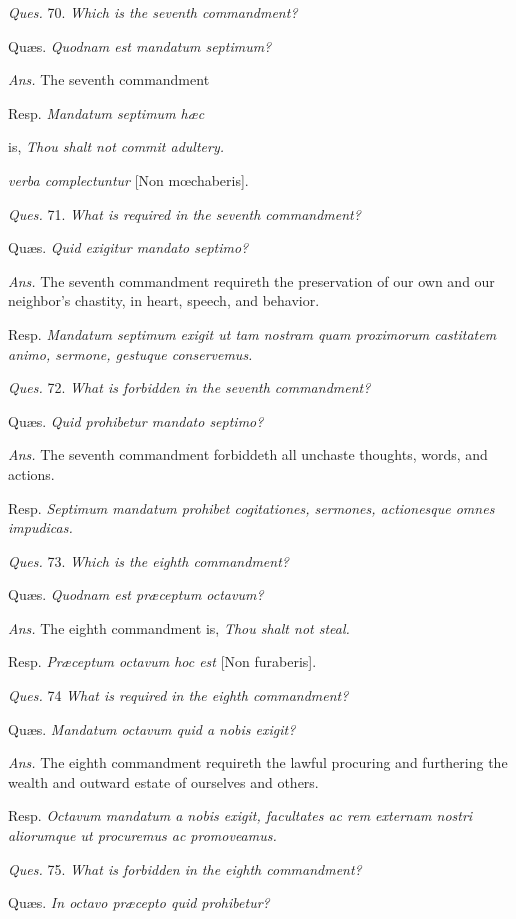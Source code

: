 \emph{Ques.} 70. \emph{Which is the seventh commandment?}

Quæs. \emph{Quodnam est mandatum septimum?}

\emph{Ans.} The seventh commandment

Resp. \emph{Mandatum septimum hæc }

is, \emph{Thou shalt not commit adultery.}

\emph{verba complectuntur} [Non mœchaberis].

\emph{Ques.} 71. \emph{What is required in the seventh commandment?}

Quæs. \emph{Quid exigitur mandato septimo?}

\emph{Ans.} The seventh commandment requireth the preservation of our own and our neighbor's chastity, in heart, speech, and behavior.

Resp. \emph{Mandatum septimum exigit ut tam nostram quam proximorum castitatem animo, sermone, gestuque conservemus.}

\emph{Ques.} 72. \emph{What is forbidden in the seventh commandment?}

Quæs. \emph{Quid prohibetur mandato septimo?}

\emph{Ans.} The seventh commandment forbiddeth all unchaste thoughts, words, and actions.

Resp. \emph{Septimum mandatum prohibet cogitationes, sermones, actionesque omnes impudicas.}

\emph{Ques.} 73. \emph{Which is the eighth commandment?}

Quæs. \emph{Quodnam est præceptum octavum?}

\emph{Ans.} The eighth commandment is, \emph{Thou shalt not steal.}

Resp. \emph{Præceptum octavum hoc est} [Non furaberis].

\emph{Ques.} 74 \emph{What is required in the eighth commandment?}

Quæs. \emph{Mandatum octavum quid a nobis exigit?}

\emph{Ans.} The eighth commandment requireth the lawful procuring and furthering the wealth and outward estate of ourselves and others.

Resp. \emph{Octavum mandatum a nobis exigit, facultates ac rem externam nostri aliorumque ut procuremus ac promoveamus.}

\emph{Ques.} 75. \emph{What is forbidden in the eighth commandment?}

Quæs. \emph{In octavo præcepto quid prohibetur?}

